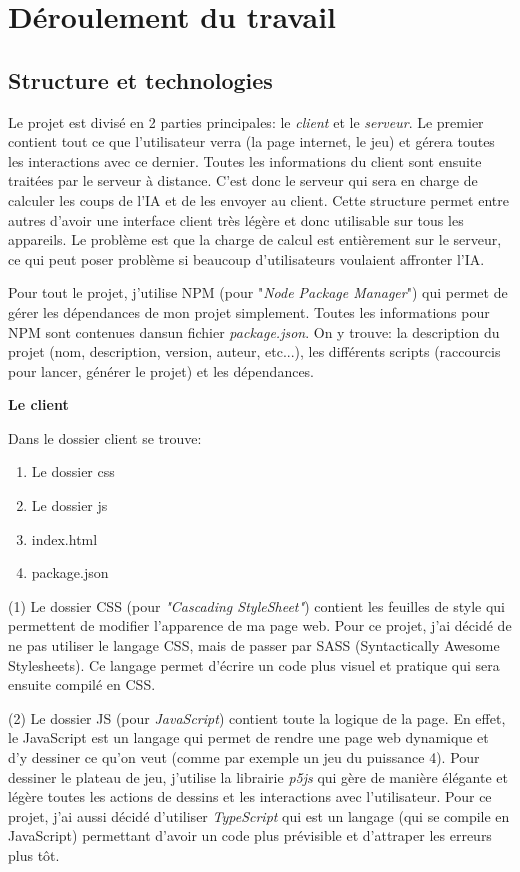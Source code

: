 \documentclass[a4paper]{article}
\newcommand{\ptitle}[1]{\vspace{10pt}
{\large \noindent \textbf{#1}}}
\begin{document}
\section{Déroulement du travail}

\subsection{Structure et technologies}

	Le projet est divisé en 2 parties principales: le \textit{client} et le \textit{serveur}. Le premier contient tout ce que l'utilisateur verra (la page internet, le jeu) et gérera toutes les interactions avec ce dernier. Toutes les informations du client sont ensuite traitées par le serveur à distance. C'est donc le serveur qui sera en charge de calculer les coups de l'IA et de les envoyer au client. Cette structure permet entre autres d'avoir une interface client très légère et donc utilisable sur tous les appareils. Le problème est que la charge de calcul est entièrement sur le serveur, ce qui peut poser problème si beaucoup d'utilisateurs voulaient affronter l'IA.

	Pour tout le projet, j'utilise NPM (pour  "\textit{Node Package Manager}") qui permet de gérer les dépendances de mon projet simplement. Toutes les informations pour NPM sont contenues dansun fichier \textit{package.json}. On y trouve: la description du projet (nom, description, version, auteur, etc...), les différents scripts (raccourcis pour lancer, générer le projet) et les dépendances.

    \ptitle{Le client}

	\noindent Dans le dossier client se trouve:
	\begin{enumerate}
		\item Le dossier css
		\item Le dossier js
		\item index.html
		\item package.json
	\end{enumerate}
    \vspace{5pt}

	(1) Le dossier CSS (pour \textit{"Cascading StyleSheet"}) contient les feuilles de style qui permettent de modifier l'apparence de ma page web. Pour ce projet, j'ai décidé de ne pas utiliser le langage CSS, mais de passer par SASS (Syntactically Awesome Stylesheets). Ce langage permet d'écrire un code plus visuel et pratique qui sera ensuite compilé en CSS.

	(2) Le dossier JS (pour \textit{JavaScript}) contient toute la logique de la page. En effet, le JavaScript est un langage qui permet de rendre une page web dynamique et d'y dessiner ce qu'on veut (comme par exemple un jeu du puissance 4). Pour dessiner le plateau de jeu, j'utilise la librairie \textit{p5js} qui gère de manière élégante et légère toutes les actions de dessins et les interactions avec l'utilisateur. Pour ce projet, j'ai aussi décidé d'utiliser \textit{TypeScript} qui est un langage (qui se compile en JavaScript) permettant d'avoir un code plus prévisible et d'attraper les erreurs plus tôt.
\end{document}
